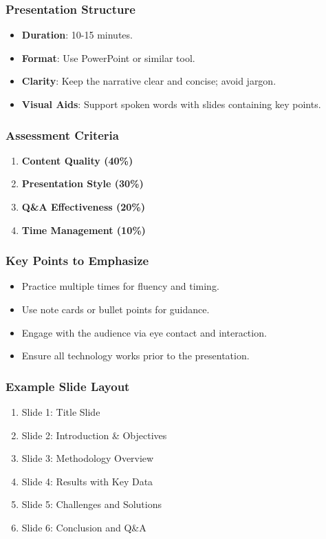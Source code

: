 \documentclass{beamer}
\begin{document}
\begin{frame}[fragile]
    \frametitle{Presentation Structure}
    \begin{itemize}
        \item \textbf{Duration}: 10-15 minutes.
        \item \textbf{Format}: Use PowerPoint or similar tool.
        \item \textbf{Clarity}: Keep the narrative clear and concise; avoid jargon.
        \item \textbf{Visual Aids}: Support spoken words with slides containing key points.
    \end{itemize}
\end{frame}

\begin{frame}[fragile]
    \frametitle{Assessment Criteria}
    \begin{enumerate}
        \item \textbf{Content Quality (40\%)}
        \item \textbf{Presentation Style (30\%)}
        \item \textbf{Q\&A Effectiveness (20\%)}
        \item \textbf{Time Management (10\%)}
    \end{enumerate}
\end{frame}

\begin{frame}[fragile]
    \frametitle{Key Points to Emphasize}
    \begin{itemize}
        \item Practice multiple times for fluency and timing.
        \item Use note cards or bullet points for guidance.
        \item Engage with the audience via eye contact and interaction.
        \item Ensure all technology works prior to the presentation.
    \end{itemize}
\end{frame}

\begin{frame}[fragile]
    \frametitle{Example Slide Layout}
    \begin{enumerate}
        \item Slide 1: Title Slide
        \item Slide 2: Introduction \& Objectives
        \item Slide 3: Methodology Overview
        \item Slide 4: Results with Key Data
        \item Slide 5: Challenges and Solutions
        \item Slide 6: Conclusion and Q\&A
    \end{enumerate}
\end{frame}
\end{document}

